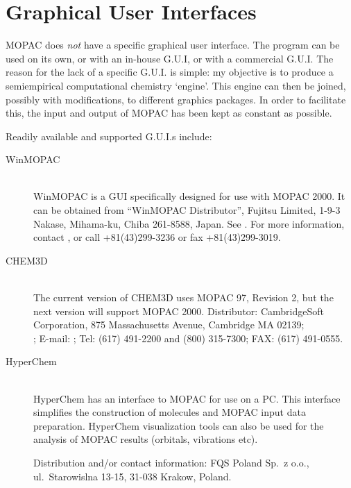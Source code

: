 \section{Graphical User Interfaces}
MOPAC does {\em not} have a specific graphical user interface.  The program can
be used on its own, or with an in-house G.U.I, or with a commercial G.U.I.  The
reason for the lack of a specific G.U.I. is simple:  my objective is to produce
a semiempirical computational chemistry `engine'.  This engine can then be
joined, possibly with modifications, to different graphics packages.  In order
to facilitate this, the input and output of MOPAC has been kept as constant as
possible.

Readily available and supported G.U.I.s include:

\begin{description}
\item[WinMOPAC]~\\
WinMOPAC is a GUI specifically designed for use with MOPAC 2000.  It  can be
obtained from  ``WinMOPAC Distributor'', Fujitsu Limited, 1-9-3 Nakase,
Mihama-ku, Chiba 261-8588,  Japan. See
.  For more
information, contact
,
or call +81(43)299-3236 or fax +81(43)299-3019.

\item[CHEM3D]~\\
The current version of CHEM3D uses MOPAC 97, Revision 2, but the next version
will support MOPAC 2000. Distributor: CambridgeSoft Corporation, 875
Massachusetts Avenue, Cambridge MA 02139; \\
;
E-mail: ;
Tel: (617) 491-2200 and (800) 315-7300; FAX: (617) 491-0555.


\item[HyperChem]~\\
HyperChem has an interface to MOPAC for use on a PC.  This interface simplifies
the construction of molecules and MOPAC input data preparation.  HyperChem
visualization tools can also be used for the analysis of MOPAC  results
(orbitals, vibrations etc).

Distribution and/or contact information:
FQS Poland Sp.\ z o.o.,  ul.\ Starowislna 13-15, 31-038 Krakow, Poland.
%
%
\end{description}


